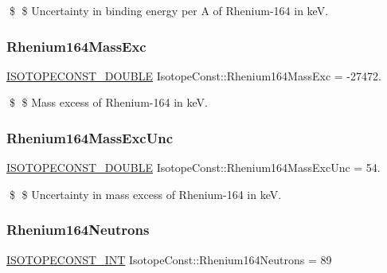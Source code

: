 \$ \$ Uncertainty in binding energy per A of Rhenium-\/164 in keV. \mbox{\label{group___isotope_const-_rhenium-_re164_ga897f29a98c923f32edcc6fce78750b98}} 
\subsubsection{\texorpdfstring{Rhenium164\+Mass\+Exc}{Rhenium164MassExc}}
{\footnotesize\ttfamily \mbox{\hyperlink{group___isotope_const-_macros_ga8f45a7272ce02c0b4c65c44636ed719a}{I\+S\+O\+T\+O\+P\+E\+C\+O\+N\+S\+T\+\_\+\+D\+O\+U\+B\+LE}} Isotope\+Const\+::\+Rhenium164\+Mass\+Exc = -\/27472.}

\$ \$ Mass excess of Rhenium-\/164 in keV. \mbox{\label{group___isotope_const-_rhenium-_re164_ga1843452d328643112ba47e34e53964c8}} 
\subsubsection{\texorpdfstring{Rhenium164\+Mass\+Exc\+Unc}{Rhenium164MassExcUnc}}
{\footnotesize\ttfamily \mbox{\hyperlink{group___isotope_const-_macros_ga8f45a7272ce02c0b4c65c44636ed719a}{I\+S\+O\+T\+O\+P\+E\+C\+O\+N\+S\+T\+\_\+\+D\+O\+U\+B\+LE}} Isotope\+Const\+::\+Rhenium164\+Mass\+Exc\+Unc = 54.}

\$ \$ Uncertainty in mass excess of Rhenium-\/164 in keV. \mbox{\label{group___isotope_const-_rhenium-_re164_ga7f084629e8f84794202bc589e6711631}} 
\subsubsection{\texorpdfstring{Rhenium164\+Neutrons}{Rhenium164Neutrons}}
{\footnotesize\ttfamily \mbox{\hyperlink{group___isotope_const-_macros_ga5f18360b3e99483a35c32d789e62621c}{I\+S\+O\+T\+O\+P\+E\+C\+O\+N\+S\+T\+\_\+\+I\+NT}} Isotope\+Const\+::\+Rhenium164\+Neutrons = 89}

